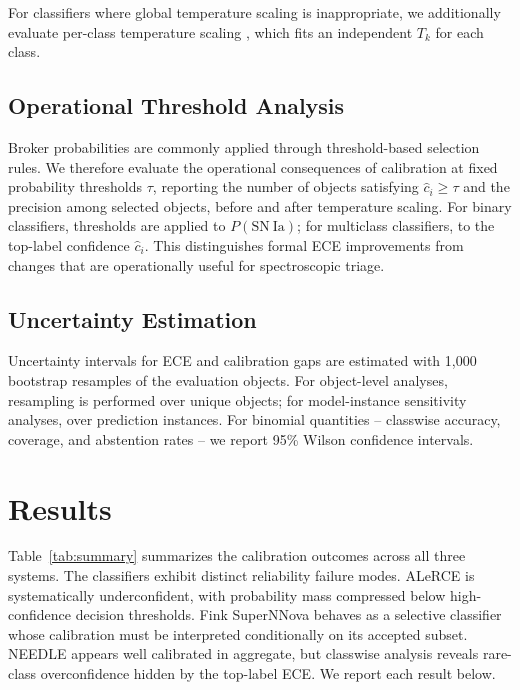 \documentclass[twocolumn]{aastex631}
\begin{document}
For classifiers where global temperature scaling is inappropriate,
we additionally evaluate per-class temperature scaling
\citep{fang2020}, which fits an independent $T_k$ for each class.

\subsection{Operational Threshold Analysis}\label{sec:thresholds}

Broker probabilities are commonly applied through threshold-based
selection rules. We therefore evaluate the operational
consequences of calibration at fixed probability thresholds
$\tau$, reporting the number of objects satisfying $\hat{c}_i
\geq \tau$ and the precision among selected objects, before and
after temperature scaling. For binary classifiers, thresholds are
applied to $P(\mathrm{SN~Ia})$; for multiclass classifiers, to
the top-label confidence $\hat{c}_i$. This distinguishes formal
ECE improvements from changes that are operationally useful for
spectroscopic triage.

\subsection{Uncertainty Estimation}\label{sec:uncertainty}

Uncertainty intervals for ECE and calibration gaps are estimated
with 1{,}000 bootstrap resamples of the evaluation objects. For
object-level analyses, resampling is performed over unique
objects; for model-instance sensitivity analyses, over prediction
instances. For binomial quantities -- classwise accuracy, coverage,
and abstention rates -- we report 95\% Wilson confidence intervals.

\section{Results} \label{sec:results}

Table~\ref{tab:summary} summarizes the calibration outcomes across
all three systems. The classifiers exhibit distinct reliability
failure modes. ALeRCE is systematically underconfident, with
probability mass compressed below high-confidence decision
thresholds. Fink SuperNNova behaves as a selective classifier
whose calibration must be interpreted conditionally on its accepted
subset. NEEDLE appears well calibrated in aggregate, but classwise
analysis reveals rare-class overconfidence hidden by the top-label
ECE. We report each result below.
\end{document}
